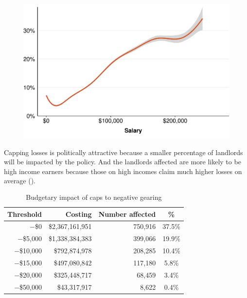 \documentclass{grattan}\usepackage[]{graphicx}\usepackage[]{color}
\begin{document}
\begin{figure}

\includegraphics[width=\columnwidth]{CGT-NG-atlas//NG-vs-salary-1}
\end{figure}

Capping losses is politically attractive because a smaller percentage of landlords will be impacted by the policy. And the landlords affected are more likely to be high income earners because those on high incomes claim much higher losses on average (). 

\begin{table}
\caption{Budgetary impact of caps to negative gearing}\label{tbl:cap-NG}
\begin{tabular}{rrrS}
  \toprule
{\textbf{Threshold}} & {\textbf{Costing}} & {\textbf{Number affected}} & {\textbf{\%}} \\ 
  \midrule
$-$\$0 & \$2,367,161,951 & 750,916 & 37.5\% \\ 
  $-$\$5,000 & \$1,338,384,383 & 399,066 & 19.9\% \\ 
  $-$\$10,000 & \$792,874,978 & 208,285 & 10.4\% \\ 
  $-$\$15,000 & \$497,080,842 & 117,180 & 5.8\% \\ 
  $-$\$20,000 & \$325,448,717 & 68,459 & 3.4\% \\ 
  $-$\$50,000 & \$43,317,917 & 8,622 & 0.4\% \\ 
   \bottomrule
\end{tabular}

\end{table}
\end{document}
